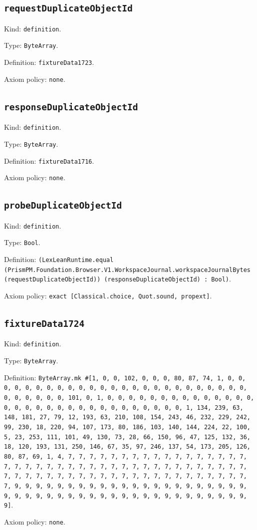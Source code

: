 \documentclass[11pt]{article}
\begin{document}
\subsection*{\texttt{requestDuplicateObjectId}}
\noindent Kind: \texttt{definition}.\par
\noindent Type: \texttt{ByteArray}.\par
\noindent Definition: \texttt{fixtureData1723}.\par
\noindent Axiom policy: \texttt{none}.\par
\subsection*{\texttt{responseDuplicateObjectId}}
\noindent Kind: \texttt{definition}.\par
\noindent Type: \texttt{ByteArray}.\par
\noindent Definition: \texttt{fixtureData1716}.\par
\noindent Axiom policy: \texttt{none}.\par
\subsection*{\texttt{probeDuplicateObjectId}}
\noindent Kind: \texttt{definition}.\par
\noindent Type: \texttt{Bool}.\par
\noindent Definition: \texttt{(LexLeanRuntime.equal (PrismPM.Foundation.Browser.V1.WorkspaceJournal.workspaceJournalBytes (requestDuplicateObjectId)) (responseDuplicateObjectId) : Bool)}.\par
\noindent Axiom policy: \texttt{exact [Classical.choice, Quot.sound, propext]}.\par
\subsection*{\texttt{fixtureData1724}}
\noindent Kind: \texttt{definition}.\par
\noindent Type: \texttt{ByteArray}.\par
\noindent Definition: \texttt{ByteArray.mk \#[1, 0, 0, 102, 0, 0, 0, 80, 87, 74, 1, 0, 0, 0, 0, 0, 0, 0, 0, 0, 0, 0, 0, 0, 0, 0, 0, 0, 0, 0, 0, 0, 0, 0, 0, 0, 0, 0, 0, 0, 0, 0, 101, 0, 1, 0, 0, 0, 0, 0, 0, 0, 0, 0, 0, 0, 0, 0, 0, 0, 0, 0, 0, 0, 0, 0, 0, 0, 0, 0, 0, 0, 0, 0, 0, 0, 1, 134, 239, 63, 148, 181, 27, 79, 12, 193, 63, 210, 108, 154, 243, 46, 232, 229, 242, 99, 230, 18, 220, 94, 107, 173, 80, 186, 103, 140, 144, 224, 22, 100, 5, 23, 253, 111, 101, 49, 130, 73, 28, 66, 150, 96, 47, 125, 132, 36, 18, 120, 193, 131, 250, 146, 67, 35, 97, 246, 137, 54, 173, 205, 126, 80, 87, 69, 1, 4, 7, 7, 7, 7, 7, 7, 7, 7, 7, 7, 7, 7, 7, 7, 7, 7, 7, 7, 7, 7, 7, 7, 7, 7, 7, 7, 7, 7, 7, 7, 7, 7, 7, 7, 7, 7, 7, 7, 7, 7, 7, 7, 7, 7, 7, 7, 7, 7, 7, 7, 7, 7, 7, 7, 7, 7, 7, 7, 7, 7, 7, 7, 7, 7, 9, 9, 9, 9, 9, 9, 9, 9, 9, 9, 9, 9, 9, 9, 9, 9, 9, 9, 9, 9, 9, 9, 9, 9, 9, 9, 9, 9, 9, 9, 9, 9, 9, 9, 9, 9, 9, 9, 9, 9, 9, 9, 9, 9, 9, 9]}.\par
\noindent Axiom policy: \texttt{none}.\par
\end{document}
